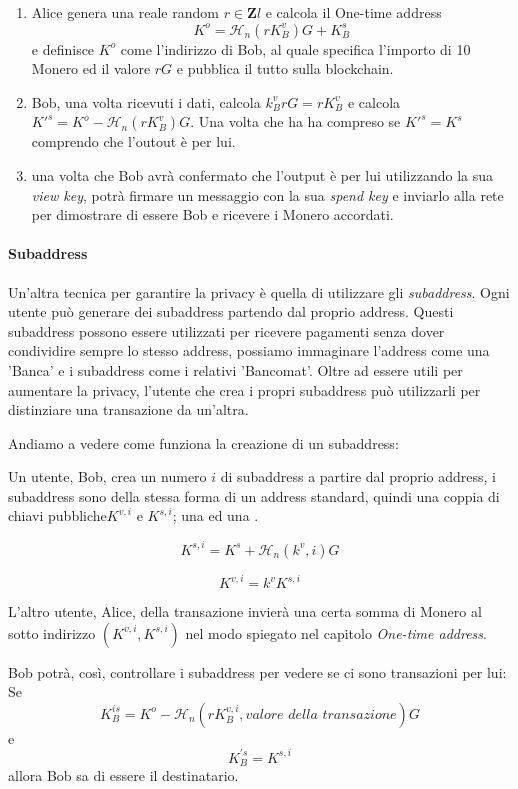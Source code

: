 \documentclass[12pt,a4paper]{article}
\begin{document}
\begin{enumerate}
    \item Alice genera una reale random $r \in \mathbf{Z}l $ e calcola il
    One-time address $$ K^{o} = \mathcal{H}_n(rK^v_B)G+K^s_B $$ e definisce
    $K^{o}$ come l'indirizzo di Bob, al quale specifica l'importo di 10 Monero
    ed il valore $rG$ e pubblica il tutto sulla blockchain.
    \item Bob, una volta ricevuti i dati, calcola $k^v_BrG = rK^v_B$ e calcola
    ${K'}^s = K^o - \mathcal{H}_n(rK^v_B)G$. Una volta che ha ha compreso se
    $K'^s = K^s$ comprendo che l'outout è per lui.
    \item una volta che Bob avrà confermato che l'output è per lui utilizzando
    la sua \textit{view key}, potrà firmare un messaggio con la sua
    \textit{spend key} e inviarlo alla rete per dimostrare di essere Bob e
    ricevere i Monero accordati.
\end{enumerate}

\paragraph{Subaddress}
Un'altra tecnica per garantire la privacy è quella di utilizzare gli
\textit{subaddress}. Ogni utente può generare dei subaddress partendo dal
proprio address. Questi subaddress possono essere utilizzati per ricevere
pagamenti senza dover condividire sempre lo stesso address, possiamo immaginare
l'address come una 'Banca' e i subaddress come i relativi 'Bancomat'. Oltre ad
essere utili per aumentare la privacy, l'utente che crea i propri subaddress può
utilizzarli per distinziare una transazione da un'altra.

Andiamo a vedere come funziona la creazione di un subaddress:

Un utente, Bob, crea un numero $ i $ di subaddress a partire dal proprio
address, i subaddress sono della stessa forma di un address standard, quindi una
coppia di chiavi pubbliche$ K^{v,i} $ e $ K^{s,i} $; una  ed una
.

$$ K^{s,i} = K^s + \mathcal{H}_n(k^v, i)G $$ 

$$ K^{v,i} = k^vK^{s,i} $$

L'altro utente, Alice, della transazione invierà una certa somma di Monero al
sotto indirizzo $ (K^{v,i}, K^{s,i}) $ nel modo spiegato nel capitolo
\textit{One-time address}.

Bob potrà, così, controllare i subaddress per vedere se ci sono transazioni per
lui: Se 
$$ K^{is}_B = K^o - \mathcal{H}_n(rK^{v,i}_B, \textit{valore della
transazione})G $$ e $$ K^{'s}_B = K^{s,i} $$ allora Bob sa di essere il
destinatario.
\end{document}
